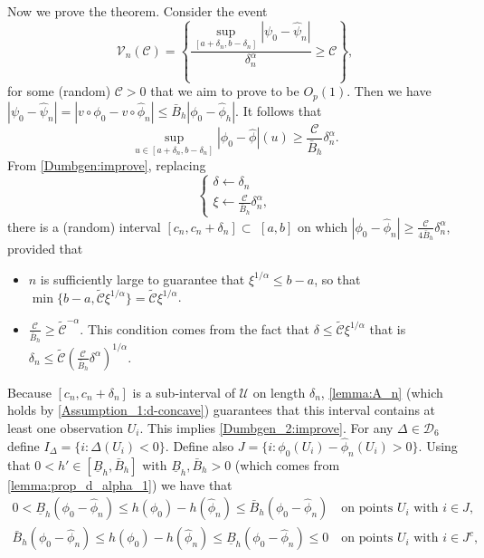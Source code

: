 \documentclass{article} %
\begin{document}
Now we prove the theorem. Consider the event
$$
\mathcal{V}_n(\mathscr{C}) = \left\{\frac{\sup_{\left[a+\delta_n, b-\delta_n\right]}|\psi_0-\widehat{\psi}_n|}{\delta_n^{\alpha}} \geq \mathscr{C}\right\},
$$
for some (random) $\mathscr{C}>0$ that we aim to prove to be $O_p(1)$. Then we have $|\psi_0-\widehat{\psi}_n| = |v\circ \phi_0 -v \circ \widehat \phi_n | \leq \bar{B}_{h} |\phi_0 - \widehat \phi_h|$. It follows that 
$$
\sup _{u \in\left[a+\delta_n, b-\delta_n\right]}|\phi_0-\widehat{\phi}|(u) \geq \frac{\mathscr{C}}{\bar{B}_{h}}\delta_n^{\alpha}.
$$
From \cref{Dumbgen:improve}, replacing 
$$
\begin{cases}
\delta \leftarrow \delta_n\\
\xi \leftarrow \frac{\mathscr{C}}{\bar{B}_{h}}\delta_n^{\alpha},
\end{cases}
$$
there is a (random) interval $\left[c_n, c_n+\delta_n\right] \subset$ $[a, b]$ on which $|\phi_0-\widehat{\phi}_n| \geq \frac{\mathscr{C}}{4 \bar{B}_{h}} \delta_n^{\alpha}$, provided that 
\begin{itemize}
    \item $n$ is sufficiently large to guarantee that $\xi^{1/\alpha} \leq b-a$, so that $\min\{b-a, \widetilde{\mathscr{C}}\xi^{1/\alpha}\} = \widetilde{\mathscr{C}}\xi^{1/\alpha}$.
    \item $\frac{\mathscr{C}}{\bar{B}_{h}} \geq \widetilde{\mathscr{C}}^{-{\alpha}}$. This condition comes from the fact that $\delta \leq \widetilde{\mathscr{C}}\xi^{1/\alpha}$ that is $\delta_n \leq \widetilde{\mathscr{C}}\left(\frac{\mathscr{C}}{\bar{B}_{h}}\delta^{\alpha}\right)^{1/\alpha}$.
\end{itemize}
Because $[c_n,c_n+\delta_n]$ is a sub-interval of $\mathcal{U}$ on length $\delta_n$, \cref{lemma:A_n} (which holds by \cref{Assumption_1:d-concave}) guarantees that this interval contains at least one observation $U_i$. This implies \cref{Dumbgen_2:improve}. For any $\Delta \in \mathcal{D}_6$ define $I_{\Delta} = \{i: \Delta (U_i) <0\}$. Define also $J = \{i: \phi_0 (U_i) -\widehat{\phi}_n (U_i) >0\}$. Using that $0<h' \in [\underline{B}_{h},\bar{B}_{h}]$ with $\underline{B}_{h},\bar{B}_{h}>0$ (which comes from \cref{lemma:prop_d_alpha_1}) we have that
\begin{align*}
0<\underline{B}_{h}(\phi_0 - \widehat{\phi}_n) \leq  h(\phi_0)-h(\widehat{\phi}_n) \leq \bar{B}_{h}(\phi_0 - \widehat{\phi}_n) \quad\text{on points } U_i \text{ with } i \in J, \nonumber \\
\bar{B}_{h}(\phi_0 - \widehat{\phi}_n) \leq  h(\phi_0)-h(\widehat{\phi}_n) \leq \underline{B}_{h}(\phi_0 - \widehat{\phi}_n) \leq 0 \quad\text{on points } U_i \text{ with } i \in J^c,
\end{align*}
\end{document}

